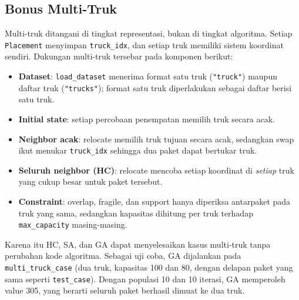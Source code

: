\documentclass[12pt,a4paper]{report}
\newcommand{\code}[1]{\texttt{\small #1}}
\begin{document}
\subsection{Bonus Multi-Truk}
Multi-truk ditangani di tingkat representasi, bukan di tingkat algoritma. Setiap
\code{Placement} menyimpan \code{truck\_idx}, dan setiap truk memiliki sistem koordinat sendiri.
Dukungan multi-truk tersebar pada komponen berikut:
\begin{itemize}[leftmargin=1.5cm]
  \item \textbf{Dataset}: \code{load\_dataset} menerima format satu truk (\code{"truck"}) maupun
        daftar truk (\code{"trucks"}); format satu truk diperlakukan sebagai daftar berisi satu truk.
  \item \textbf{Initial state}: setiap percobaan penempatan memilih truk secara acak.
  \item \textbf{Neighbor acak}: relocate memilih truk tujuan secara acak, sedangkan swap ikut
        menukar \code{truck\_idx} sehingga dua paket dapat bertukar truk.
  \item \textbf{Seluruh neighbor (HC)}: relocate mencoba setiap koordinat di \emph{setiap} truk yang
        cukup besar untuk paket tersebut.
  \item \textbf{Constraint}: overlap, fragile, dan support hanya diperiksa antarpaket pada truk yang
        sama, sedangkan kapasitas dihitung per truk terhadap \code{max\_capacity} masing-masing.
\end{itemize}
Karena itu HC, SA, dan GA dapat menyelesaikan kasus multi-truk tanpa perubahan kode algoritma.
Sebagai uji coba, GA dijalankan pada \code{multi\_truck\_case} (dua truk, kapasitas 100 dan 80,
dengan delapan paket yang sama seperti \code{test\_case}). Dengan populasi 10 dan 10 iterasi, GA
memperoleh value 305, yang berarti seluruh paket berhasil dimuat ke dua truk.
\end{document}
